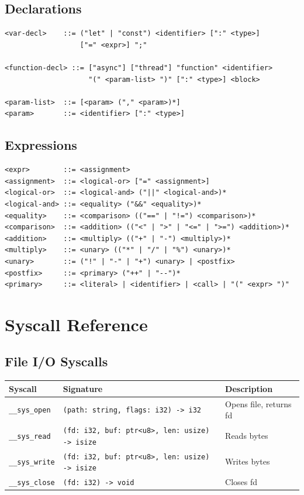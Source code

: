 \documentclass[12pt,a4paper]{article}
\theoremstyle{definition}
\begin{document}
\subsection{Declarations}

\begin{verbatim}
<var-decl>    ::= ("let" | "const") <identifier> [":" <type>] 
                  ["=" <expr>] ";"

<function-decl> ::= ["async"] ["thread"] "function" <identifier>
                    "(" <param-list> ")" [":" <type>] <block>

<param-list>  ::= [<param> ("," <param>)*]
<param>       ::= <identifier> [":" <type>]
\end{verbatim}

\subsection{Expressions}

\begin{verbatim}
<expr>        ::= <assignment>
<assignment>  ::= <logical-or> ["=" <assignment>]
<logical-or>  ::= <logical-and> ("||" <logical-and>)*
<logical-and> ::= <equality> ("&&" <equality>)*
<equality>    ::= <comparison> (("==" | "!=") <comparison>)*
<comparison>  ::= <addition> (("<" | ">" | "<=" | ">=") <addition>)*
<addition>    ::= <multiply> (("+" | "-") <multiply>)*
<multiply>    ::= <unary> (("*" | "/" | "%") <unary>)*
<unary>       ::= ("!" | "-" | "+") <unary> | <postfix>
<postfix>     ::= <primary> ("++" | "--")*
<primary>     ::= <literal> | <identifier> | <call> | "(" <expr> ")"
\end{verbatim}

\newpage

\section{Syscall Reference}

\subsection{File I/O Syscalls}

\begin{tabular}{|l|l|p{6cm}|}
\hline
\textbf{Syscall} & \textbf{Signature} & \textbf{Description} \\
\hline
\texttt{\_\_sys\_open} & \texttt{(path: string, flags: i32) -> i32} & Opens file, returns fd \\
\texttt{\_\_sys\_read} & \texttt{(fd: i32, buf: ptr<u8>, len: usize) -> isize} & Reads bytes \\
\texttt{\_\_sys\_write} & \texttt{(fd: i32, buf: ptr<u8>, len: usize) -> isize} & Writes bytes \\
\texttt{\_\_sys\_close} & \texttt{(fd: i32) -> void} & Closes fd \\
\hline
\end{tabular}
\end{document}
